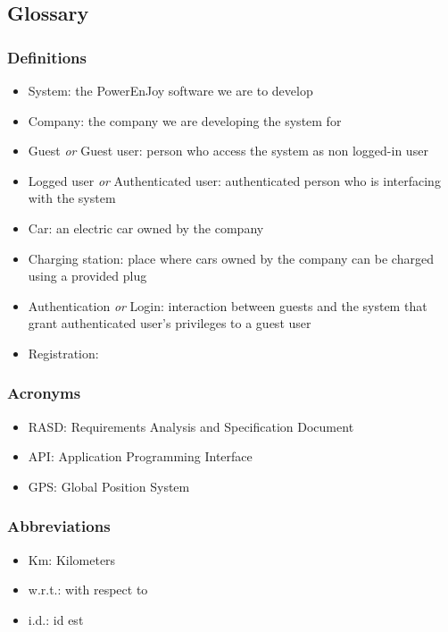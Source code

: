 \subsection{Glossary}
	\subsubsection{Definitions}
	\begin{itemize}
		\item System: the PowerEnJoy software we are to develop
		\item Company: the company we are developing the system for
		\item Guest \emph{or} Guest user: person who access the system as non logged-in user
		\item Logged user \emph{or} Authenticated user: authenticated person who is interfacing with the system
		\item Car: an electric car owned by the company
		\item Charging station: place where cars owned by the company can be charged using a provided plug
		\item Authentication \emph{or} Login: interaction between guests and the system that grant authenticated user's privileges to a guest user
		\item Registration: 
	\end{itemize}
\subsubsection{Acronyms}
	\begin{itemize}
		\item RASD: Requirements Analysis and Specification Document
		\item API: Application Programming Interface
		\item GPS: Global Position System
	\end{itemize}
\subsubsection{Abbreviations}
	\begin{itemize}
		\item Km: Kilometers
		\item w.r.t.: with respect to
		\item i.d.: id est
	\end{itemize}